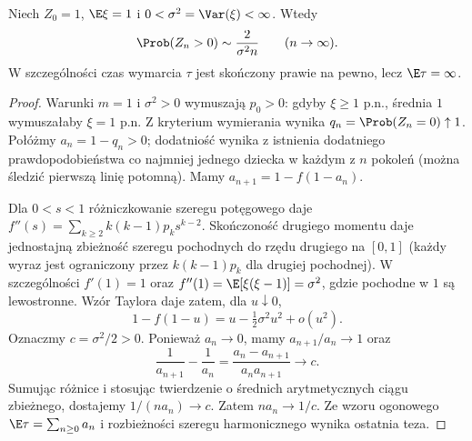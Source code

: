 \begin{twierdzenie}
\label{thm:gw-critical-survival}
Niech $Z_0=1$, $\E\xi=1$ i
$0<\sigma^2=\Var(\xi)<\infty$.
Wtedy
\[
\Prob(Z_n>0)\sim\frac{2}{\sigma^2 n}
\qquad(n\to\infty).
\]
W szczególności czas wymarcia $\tau$ jest skończony
prawie na pewno, lecz $\E\tau=\infty$.
\end{twierdzenie}
\begin{proof}
Warunki $m=1$ i $\sigma^2>0$ wymuszają $p_0>0$:
gdyby $\xi\ge1$ p.n., średnia $1$ wymuszałaby
$\xi=1$ p.n. Z kryterium wymierania wynika
$q_n=\Prob(Z_n=0)\uparrow1$.
Połóżmy $a_n=1-q_n>0$; dodatniość wynika
z istnienia dodatniego prawdopodobieństwa
co najmniej jednego dziecka w każdym z $n$
pokoleń (można śledzić pierwszą linię potomną).
Mamy $a_{n+1}=1-f(1-a_n)$.

Dla $0<s<1$ różniczkowanie szeregu potęgowego
daje $f''(s)=\sum_{k\ge2} k(k-1)p_k s^{k-2}$.
Skończoność drugiego momentu daje jednostajną
zbieżność szeregu pochodnych do rzędu drugiego
na $[0,1]$ (każdy wyraz jest ograniczony przez
$k(k-1)p_k$ dla drugiej pochodnej).
W szczególności $f'(1)=1$ oraz
$f''(1)=\E[\xi(\xi-1)]=\sigma^2$,
gdzie pochodne w $1$ są lewostronne.
Wzór Taylora daje zatem, dla $u\downarrow0$,
\[
1-f(1-u)=u-\tfrac12\sigma^2u^2+o(u^2).
\]
Oznaczmy $c=\sigma^2/2>0$. Ponieważ $a_n\to0$,
mamy $a_{n+1}/a_n\to1$ oraz
\[
\frac1{a_{n+1}}-\frac1{a_n}
=\frac{a_n-a_{n+1}}{a_na_{n+1}}\longrightarrow c.
\]
Sumując różnice i stosując twierdzenie o średnich
arytmetycznych ciągu zbieżnego, dostajemy
$1/(na_n)\to c$. Zatem $na_n\to1/c$.
Ze wzoru ogonowego $\E\tau=\sum_{n\ge0}a_n$
i rozbieżności szeregu harmonicznego wynika
ostatnia teza.
\end{proof}

